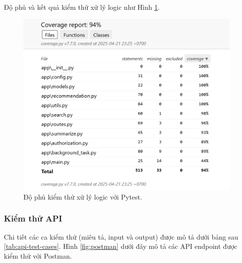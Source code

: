 \noindent Độ phủ và kết quả kiểm thử xử lý logic như Hình \ref{fig:pytest-testing}.

\begin{figure}[H]
    \centering  
    \includegraphics[width=1\textwidth]{figures/c4/unittest.png}
    \caption{Độ phủ kiểm thử xử lý logic với Pytest.}
    \label{fig:pytest-testing}
\end{figure}


\subsubsection{Kiểm thử API}

Chi tiết các ca kiểm thử (miêu tả, input và output) được mô tả dưới bảng sau \ref{tab:api-test-cases}. Hình \ref{fig:postman} dưới đây mô tả các API endpoint được kiểm thử với Postman\cite{postman}.  

